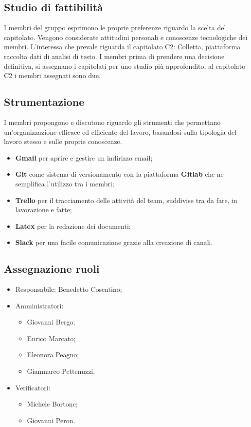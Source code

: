 \documentclass[11pt,a4paper]{article}
\begin{document}
	\subsection{Studio di fattibilità}
	I membri del gruppo esprimono le proprie preferenze riguardo la scelta del capitolato. Vengono considerate attitudini personali e conoscenze tecnologiche dei membri. L'interessa che prevale riguarda il capitolato C2: Colletta, piattaforma raccolta dati di analisi di testo. I membri prima di prendere una decisione definitiva, si assegnano i capitolati per uno studio più approfondito, al capitolato C2 i membri assegnati sono due.
	\subsection{Strumentazione}	
	I membri propongono e discutono riguardo gli strumenti che permettano un'organizzazione efficace ed efficiente del lavoro,  basandosi sulla tipologia del lavoro stesso e sulle proprie conoscenze. 
	\begin{itemize}
	\item  \textbf{Gmail} per aprire e gestire un indirizzo email;
	\item  \textbf{Git} come sistema di versionamento con la piattaforma \textbf{Gitlab} che ne semplifica l'utilizzo tra i membri;
	\item  \textbf{Trello} per il tracciamento delle attività del team, suddivise tra da fare, in lavorazione e fatte;
	\item  \textbf{Latex} per la redazione dei documenti;
	\item \textbf{Slack} per una facile comunicazione grazie alla creazione di canali.
	\end{itemize}
	\subsection{Assegnazione ruoli} 
	
	\begin{itemize}
	\item Responsabile: Benedetto Cosentino;
	\item Amministratori:
		\begin{itemize}
		\item Giovanni Bergo;
		\item Enrico Marcato;
		\item Eleonora Peagno;
		\item Gianmarco Pettenuzzi.
		\end{itemize}
	\item Verificatori:
		\begin{itemize}
			\item Michele Bortone;
			\item Giovanni Peron.
		\end{itemize}
	\end{itemize}
\end{document}
